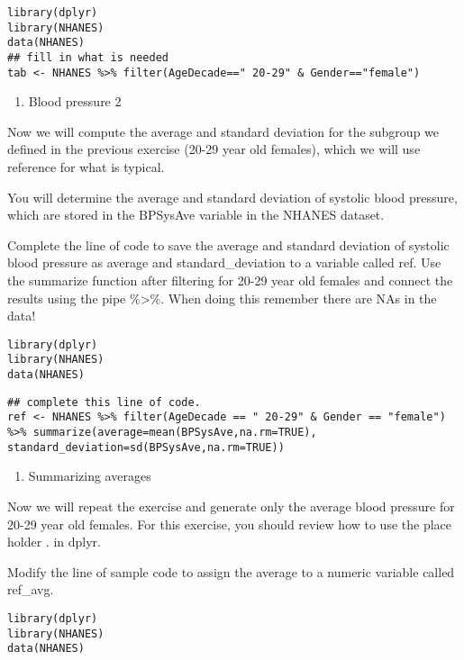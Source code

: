 \documentclass[]{article}
\providecommand{\tightlist}{%
  \setlength{\itemsep}{0pt}\setlength{\parskip}{0pt}}
\begin{document}
\begin{verbatim}
library(dplyr)
library(NHANES)
data(NHANES)
## fill in what is needed
tab <- NHANES %>% filter(AgeDecade==" 20-29" & Gender=="female")
\end{verbatim}

\begin{enumerate}
\def\labelenumi{\arabic{enumi}.}
\setcounter{enumi}{1}
\tightlist
\item
  Blood pressure 2
\end{enumerate}

Now we will compute the average and standard deviation for the subgroup
we defined in the previous exercise (20-29 year old females), which we
will use reference for what is typical.

You will determine the average and standard deviation of systolic blood
pressure, which are stored in the BPSysAve variable in the NHANES
dataset.

Complete the line of code to save the average and standard deviation of
systolic blood pressure as average and standard\_deviation to a variable
called ref. Use the summarize function after filtering for 20-29 year
old females and connect the results using the pipe \%\textgreater{}\%.
When doing this remember there are NAs in the data!

\begin{verbatim}
library(dplyr)
library(NHANES)
data(NHANES)
\end{verbatim}

\begin{verbatim}
## complete this line of code.
ref <- NHANES %>% filter(AgeDecade == " 20-29" & Gender == "female") %>% summarize(average=mean(BPSysAve,na.rm=TRUE), standard_deviation=sd(BPSysAve,na.rm=TRUE))
\end{verbatim}

\begin{enumerate}
\def\labelenumi{\arabic{enumi}.}
\setcounter{enumi}{2}
\tightlist
\item
  Summarizing averages
\end{enumerate}

Now we will repeat the exercise and generate only the average blood
pressure for 20-29 year old females. For this exercise, you should
review how to use the place holder . in dplyr.

Modify the line of sample code to assign the average to a numeric
variable called ref\_avg.

\begin{verbatim}
library(dplyr)
library(NHANES)
data(NHANES)
\end{verbatim}
\end{document}
